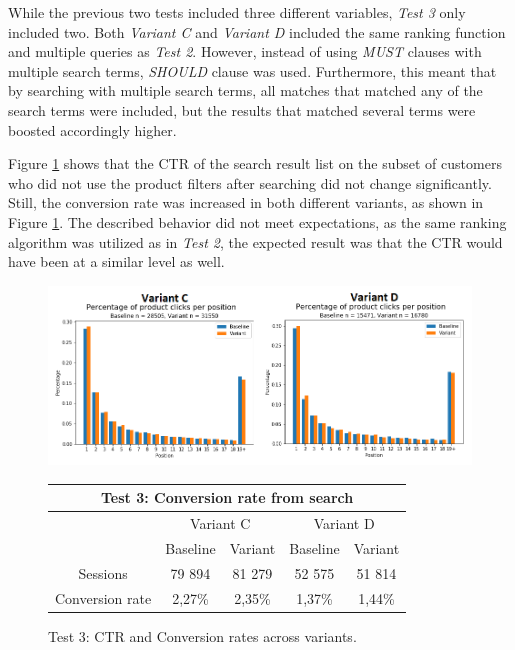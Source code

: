 

While the previous two tests included three different variables, \emph{Test 3} only included two.
Both \emph{Variant C} and \emph{Variant D} included the same ranking function and multiple queries as 
\emph{Test 2}.
However, instead of using \emph{MUST} clauses with multiple search terms, \emph{SHOULD} clause was used.
Furthermore, this meant that by searching with multiple search terms, all matches that matched any of 
the search terms were included, but the results that matched several terms were boosted accordingly higher.

Figure \ref{fig:search_v3} shows that the CTR of the search result list on the subset of customers who did not 
use the product filters after searching did not change significantly.
Still, the conversion rate was increased in both different variants, as shown in Figure \ref{fig:search_v3}.
The described behavior did not meet expectations, as the same ranking algorithm was utilized as in \emph{Test 2},
the expected result was that the CTR would have been at a similar level as well.


\begin{figure}[p]
    \centering
    
    \includegraphics[width=\textwidth]{img/search_v3.png}

    \begin{tabular}{|c||c|c||c|c|}
    \hline
    \multicolumn{5}{|c|}{Test 3: Conversion rate from search} \\ \hline \hline
    & \multicolumn{2}{|c||}{Variant C} & \multicolumn{2}{|c|}{Variant D} \\ \cline{2-5}
    & Baseline & Variant & Baseline & Variant \\ \hline
    Sessions & 79 894 & 81 279 & 52 575 & 51 814 \\ \hline
    Conversion rate & 2,27\% & 2,35\% & 1,37\% & 1,44\% \\ \hline
    \end{tabular}
    \caption{Test 3: CTR and Conversion rates across variants.}
    
    \label{fig:search_v3}
\end{figure}




